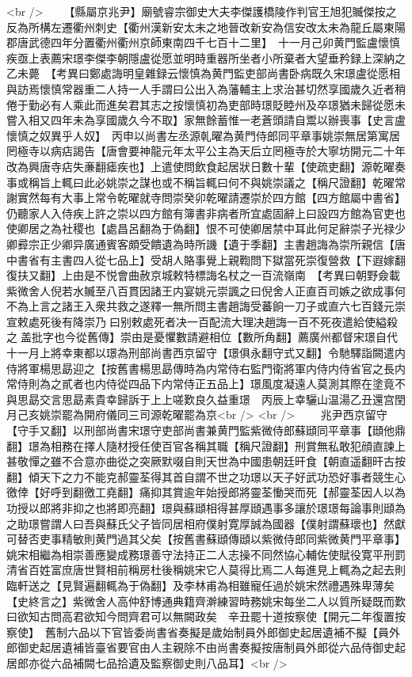 <br />
　　【縣屬京兆尹】廟號睿宗御史大夫李傑護橋陵作判官王旭犯贓傑按之反為所構左遷衢州刺史【衢州漢新安太未之地晉改新安為信安改太未為龍丘屬東陽郡唐武德四年分置衢州衢州京師東南四千七百十二里】　十一月己卯黄門監盧懷慎疾亟上表薦宋璟李傑李朝隱盧從愿並明時重器所坐者小所棄者大望垂矜録上深納之乙未薨　【考異曰鄭處誨明皇雜録云懷慎為黄門監吏部尚書卧病既久宋璟盧從愿相與訪焉懷慎常器重二人持一人手謂曰公出入為藩輔主上求治甚切然享國歲久近者稍倦于勤必有人乘此而進矣君其志之按懷慎初為吏部時璟貶睦州及卒璟猶未歸從愿未嘗入相又四年未為享國歲久今不取】家無餘蓄惟一老蒼頭請自鬻以辦喪事【史言盧懷慎之奴異乎人奴】　丙申以尚書左丞源乹曜為黄門侍郎同平章事姚崇無居第寓居罔極寺以病痁謁告【唐會要神龍元年太平公主為天后立罔極寺於大寧坊開元二十年改為興唐寺痁失亷翻瘧疾也】上遣使問飲食起居狀日數十輩【使疏吏翻】源乾曜奏事或稱旨上輒曰此必姚崇之謀也或不稱旨輒曰何不與姚崇議之【稱尺證翻】乾曜常謝實然每有大事上常令乾曜就寺問崇癸卯乾曜請遷崇於四方館【四方館屬中書省】仍聽家人入侍疾上許之崇以四方館有簿書非病者所宜處固辭上曰設四方館為官吏也使卿居之為社稷也【處昌呂翻為于偽翻】恨不可使卿居禁中耳此何足辭崇子光禄少卿彛宗正少卿异廣通賓客頗受饋遺為時所譏【遺于季翻】主書趙誨為崇所親信【唐中書省有主書四人從七品上】受胡人賂事覺上親鞫問下獄當死崇復營救【下遐嫁翻復扶又翻】上由是不悦會曲赦京城敕特標誨名杖之一百流嶺南　【考異曰朝野僉載紫微舍人倪若水贓至八百貫因諸王内宴姚元崇諷之曰倪舍人正直百司嫉之欲成事何不為上言之諸王入衆共救之遂釋一無所問主書趙誨受蕃餉一刀子或直六七百錢元崇宣敕處死後有降崇乃曰别敕處死者决一百配流大理决趙誨一百不死夜遣給使縊殺之盖批字也今從舊傳】崇由是憂懼數請避相位【數所角翻】薦廣州都督宋璟自代十一月上將幸東都以璟為刑部尚書西京留守【璟俱永翻守式又翻】令馳驛詣闕遣内侍將軍楊思勗迎之【按舊書楊思勗傳時為内常侍右監門衛將軍内侍内侍省官之長内常侍則為之貳者也内侍從四品下内常侍正五品上】璟風度凝遠人莫測其際在塗竟不與思勗交言思勗素貴幸歸訴于上上嗟歎良久益重璟　丙辰上幸驪山温湯乙丑還宫閏月己亥姚崇罷為開府儀同三司源乾曜罷為京<br />
<br />
　　兆尹西京留守【守手又翻】以刑部尚書宋璟守吏部尚書兼黄門監紫微侍郎蘇頲同平章事【頲他鼎翻】璟為相務在擇人隨材授任使百官各稱其職【稱尺證翻】刑賞無私敢犯顔直諫上甚敬憚之雖不合意亦曲從之突厥默啜自則天世為中國患朝廷旰食【朝直遥翻旰古按翻】傾天下之力不能克郝靈荃得其首自謂不世之功璟以天子好武功恐好事者競生心徼倖【好呼到翻徼工堯翻】痛抑其賞逾年始授郎將靈荃慟哭而死【郝靈荃因人以為功授以郎將非抑之也將即亮翻】璟與蘇頲相得甚厚頲遇事多讓於璟璟每論事則頲為之助璟嘗謂人曰吾與蘇氏父子皆同居相府僕射寛厚誠為國器【僕射謂蘇瓌也】然獻可替否吏事精敏則黄門過其父矣【按舊書蘇頲傳頲以紫微侍郎同紫微黄門平章事】姚宋相繼為相崇善應變成務璟善守法持正二人志操不同然協心輔佐使賦役寛平刑罰清省百姓富庶唐世賢相前稱房杜後稱姚宋它人莫得比焉二人每進見上輒為之起去則臨軒送之【見賢遍翻輒為于偽翻】及李林甫為相雖寵任過於姚宋然禮遇殊卑薄矣【史終言之】紫微舍人高仲舒博通典籍齊澣練習時務姚宋每坐二人以質所疑既而歎曰欲知古問高君欲知今問齊君可以無闕政矣　辛丑罷十道按察使【開元二年復置按察使】　舊制六品以下官皆委尚書省奏擬是歲始制員外郎御史起居遺補不擬【員外郎御史起居遺補皆臺省要官由人主親除不由尚書奏擬按唐制員外郎從六品侍御史起居郎亦從六品補闕七品拾遺及監察御史則八品耳】<br />

